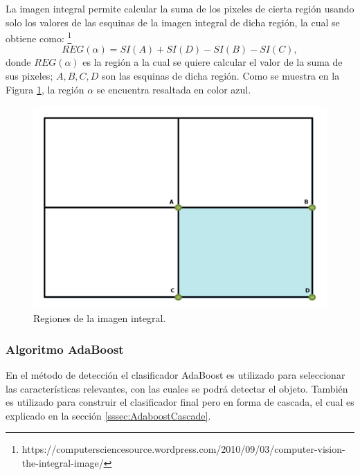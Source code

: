 La imagen integral permite calcular la suma de los pixeles de cierta región usando solo los valores de las esquinas de la imagen integral de dicha región, la cual se obtiene como: \footnote{https://computersciencesource.wordpress.com/2010/09/03/computer-vision-the-integral-image/}    
\begin{equation}
REG(\alpha)=SI(A)+SI(D)-SI(B)-SI(C),
\end{equation}
donde $REG(\alpha)$ es la región a la cual se quiere calcular el valor de la suma de sus pixeles; $A,B,C,D$ son las esquinas de dicha región. Como se muestra en la Figura \ref{fig:figImageIntegral}, la región $\alpha$ se encuentra resaltada en color azul.  
\begin{figure}[h!]
\begin{center}
\includegraphics[scale=.25]{./Figures/IntegralImage.png}
\end{center}
\caption{Regiones de la imagen integral.}
\label{fig:figImageIntegral}
\end{figure} 


\subsubsection{Algoritmo AdaBoost}\label{sssec:AdaboostClasifier}  

En el método de detección el clasificador AdaBoost es utilizado para seleccionar las características relevantes, con las cuales se podrá detectar el objeto. También es utilizado para construir el clasificador final pero en forma de cascada, el cual es explicado en la sección \ref{sssec:AdaboostCascade}. 

